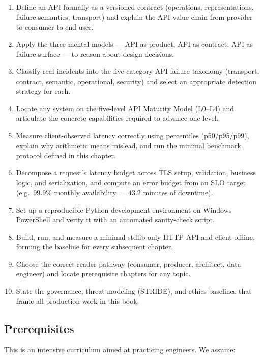 \begin{enumerate}[label=\textbf{LO-\arabic*.}]
  \item Define an API formally as a versioned contract (operations,
        representations, failure semantics, transport) and explain the API
        value chain from provider to consumer to end user.
  \item Apply the three mental models --- API as product, API as contract,
        API as failure surface --- to reason about design decisions.
  \item Classify real incidents into the five-category API failure taxonomy
        (transport, contract, semantic, operational, security) and select an
        appropriate detection strategy for each.
  \item Locate any system on the five-level API Maturity Model (L0--L4) and
        articulate the concrete capabilities required to advance one level.
  \item Measure client-observed latency correctly using percentiles
        (p50/p95/p99), explain why arithmetic means mislead, and run the
        minimal benchmark protocol defined in this chapter.
  \item Decompose a request's latency budget across TLS setup, validation,
        business logic, and serialization, and compute an error budget from
        an SLO target (e.g.\ 99.9\% monthly availability $= 43.2$ minutes of
        downtime).
  \item Set up a reproducible Python development environment on Windows
        PowerShell and verify it with an automated sanity-check script.
  \item Build, run, and measure a minimal stdlib-only HTTP API and client
        offline, forming the baseline for every subsequent chapter.
  \item Choose the correct reader pathway (consumer, producer, architect,
        data engineer) and locate prerequisite chapters for any topic.
  \item State the governance, threat-modeling (STRIDE), and ethics baselines
        that frame all production work in this book.
\end{enumerate}

\subsection{Prerequisites}

This is an intensive curriculum aimed at practicing engineers. We assume:

